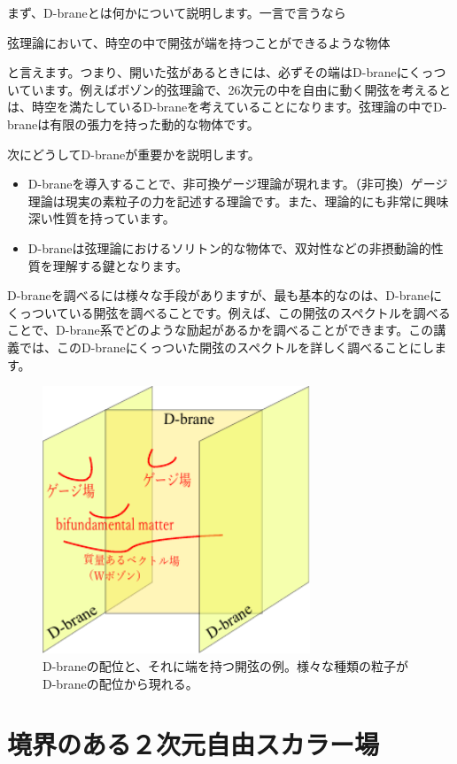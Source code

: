 \documentclass[report,paper=a4, fontsize=12pt, line_length=16cm, number_of_lines=34,dvipdfmx]{jlreq}
\newenvironment{important}{\begin{tcolorbox}[
  colback = white,
  colframe = red!35,
  boxrule = 2mm,
  fonttitle = \bfseries,
  after = \noindent] }{\end{tcolorbox}}
\numberwithin{equation}{chapter}
\numberwithin{equation}{section}
\begin{document}
まず、D-braneとは何かについて説明します。一言で言うなら
\begin{important}
  弦理論において、時空の中で開弦が端を持つことができるような物体
\end{important}
と言えます。つまり、開いた弦があるときには、必ずその端はD-braneにくっついています。例えばボゾン的弦理論で、26次元の中を自由に動く開弦を考えるとは、時空を満たしているD-braneを考えていることになります。弦理論の中でD-braneは有限の張力を持った動的な物体です。

次にどうしてD-braneが重要かを説明します。
\begin{itemize}
  \item D-braneを導入することで、非可換ゲージ理論が現れます。（非可換）ゲージ理論は現実の素粒子の力を記述する理論です。また、理論的にも非常に興味深い性質を持っています。
  \item D-braneは弦理論におけるソリトン的な物体で、双対性などの非摂動論的性質を理解する鍵となります。
\end{itemize}

D-braneを調べるには様々な手段がありますが、最も基本的なのは、D-braneにくっついている開弦を調べることです。例えば、この開弦のスペクトルを調べることで、D-brane系でどのような励起があるかを調べることができます。この講義では、このD-braneにくっついた開弦のスペクトルを詳しく調べることにします。

\begin{figure}
  \centering
  \includegraphics[width=8cm]{generalbrane.pdf}
  \caption{D-braneの配位と、それに端を持つ開弦の例。様々な種類の粒子がD-braneの配位から現れる。}
\end{figure}


\section{境界のある２次元自由スカラー場}
\end{document}
